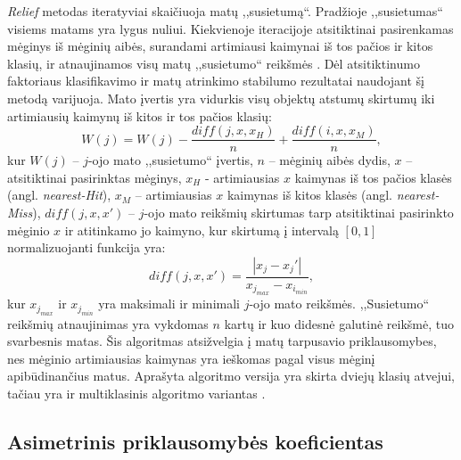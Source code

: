\textit{Relief} metodas iteratyviai skaičiuoja matų ,,susietumą``. Pradžioje ,,susietumas`` visiems matams yra lygus nuliui. Kiekvienoje iteracijoje atsitiktinai pasirenkamas mėginys iš mėginių aibės, surandami artimiausi kaimynai iš tos pačios ir kitos klasių, ir atnaujinamos visų matų ,,susietumo`` reikšmės \cite{DBLP:journals/ml/Robnik-SikonjaK03}. Dėl atsitiktinumo faktoriaus klasifikavimo ir  matų atrinkimo stabilumo rezultatai naudojant šį metodą varijuoja. Mato įvertis yra vidurkis visų objektų atstumų skirtumų iki artimiausių kaimynų iš kitos ir tos pačios klasių:
\begin{equation}
 W(j)=W(j) - \frac{diff(j, x, x_H)}{n} + \frac{diff(i, x, x_M)}{n},
\end{equation}
kur 
$W(j)$ -- $j$-ojo mato ,,susietumo`` įvertis, 
$n$ -- mėginių aibės dydis, 
$x$ -- atsitiktinai pasirinktas mėginys, 
$x_H$ - artimiausias $x$ kaimynas iš tos pačios klasės (angl. \textit{nearest-Hit}), 
$x_M$ -- artimiausias $x$ kaimynas iš kitos klasės (angl. \textit{nearest-Miss}),
$diff(j, x, x')$ -- $j$-ojo mato reikšmių skirtumas tarp atsitiktinai pasirinkto mėginio $x$ ir atitinkamo jo kaimyno, kur skirtumą į intervalą $[0, 1]$ normalizuojanti funkcija yra:
\begin{equation}
 diff(j, x, x')=\frac{|x_j- x_j'|}{x_{j_{max}} - x_{i_{min}}},
\end{equation}
kur $x_{j_{max}}$ ir $x_{j_{min}}$ yra maksimali ir minimali $j$-ojo mato reikšmės. ,,Susietumo`` reikšmių atnaujinimas yra vykdomas $n$ kartų ir kuo didesnė galutinė reikšmė, tuo svarbesnis matas. Šis algoritmas atsižvelgia į matų tarpusavio priklausomybes, nes mėginio artimiausias kaimynas yra ieškomas pagal visus mėginį apibūdinančius matus. Aprašyta algoritmo versija yra skirta dviejų klasių atvejui, tačiau yra ir multiklasinis algoritmo variantas \cite{DBLP:journals/ml/Robnik-SikonjaK03}.

\subsection{Asimetrinis priklausomybės koeficientas}

